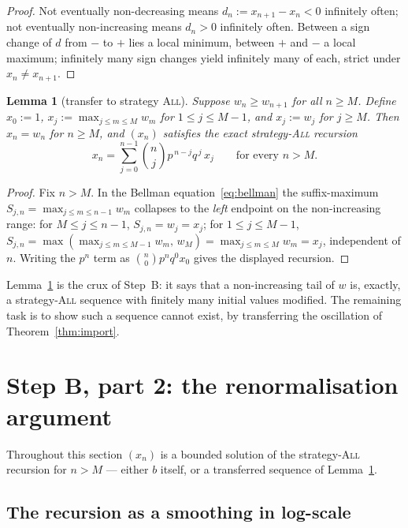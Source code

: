 \documentclass[11pt]{article}
\newtheorem{lemma}[theorem]{Lemma}
\theoremstyle{definition}
\newcommand{\All}{\textsc{All}}
\begin{document}
\begin{proof}
  Not eventually non-decreasing means $d_n:=x_{n+1}-x_n<0$ infinitely
  often; not eventually non-increasing means $d_n>0$ infinitely
  often. Between a sign change of $d$ from $-$ to $+$ lies a local
  minimum, between $+$ and $-$ a local maximum; infinitely many sign
  changes yield infinitely many of each, strict under $x_n\ne x_{n+1}$.
\end{proof}

\begin{lemma}[transfer to strategy \All]\label{lem:transfer}
  Suppose $w_n\ge w_{n+1}$ for all $n\ge M$. Define $x_0:=1$,
  $x_j:=\max_{j\le m\le M}w_m$ for $1\le j\le M-1$, and $x_j:=w_j$ for
  $j\ge M$. Then $x_n=w_n$ for $n\ge M$, and $(x_n)$ satisfies the
  exact strategy-\All{} recursion
  \[
    x_n=\sum_{j=0}^{n-1}\binom nj p^{\,n-j}q^{\,j}\,x_j
    \qquad\text{for every }n>M .
  \]
\end{lemma}

\begin{proof}
  Fix $n>M$. In the Bellman equation~\eqref{eq:bellman} the
  suffix-maximum $S_{j,n}=\max_{j\le m\le n-1}w_m$ collapses to the
  \emph{left} endpoint on the non-increasing range: for $M\le j\le
  n-1$, $S_{j,n}=w_j=x_j$; for $1\le j\le M-1$,
  $S_{j,n}=\max(\max_{j\le m\le M-1}w_m,\,w_M)=\max_{j\le m\le
  M}w_m=x_j$, independent of $n$. Writing the $p^n$ term as
  $\binom n0p^nq^0x_0$ gives the displayed recursion.
\end{proof}

Lemma~\ref{lem:transfer} is the crux of Step~B: it says that a
non-increasing tail of $w$ is, exactly, a strategy-\All{} sequence
with finitely many initial values modified. The remaining task is to
show such a sequence cannot exist, by transferring the oscillation of
Theorem~\ref{thm:import}.

\section{Step B, part 2: the renormalisation argument}\label{sec:renorm}

Throughout this section $(x_n)$ is a bounded solution of the
strategy-\All{} recursion for $n>M$ --- either $b$ itself, or a
transferred sequence of Lemma~\ref{lem:transfer}.

\subsection{The recursion as a smoothing in log-scale}
\end{document}

